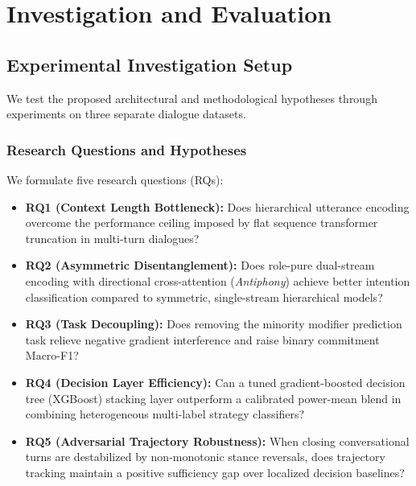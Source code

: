\chapter{Investigation and Evaluation}
\label{ch:evaluation}

\section{Experimental Investigation Setup}
\label{sec:investigation}

We test the proposed architectural and methodological hypotheses through experiments on three separate dialogue datasets.

\subsection{Research Questions and Hypotheses}
We formulate five research questions (RQs):
\begin{itemize}
  \item \textbf{RQ1 (Context Length Bottleneck):} Does hierarchical utterance encoding overcome the performance ceiling imposed by flat sequence transformer truncation in multi-turn dialogues?
  \item \textbf{RQ2 (Asymmetric Disentanglement):} Does role-pure dual-stream encoding with directional cross-attention (\textit{Antiphony}) achieve better intention classification compared to symmetric, single-stream hierarchical models?
  \item \textbf{RQ3 (Task Decoupling):} Does removing the minority modifier prediction task relieve negative gradient interference and raise binary commitment Macro-F1?
  \item \textbf{RQ4 (Decision Layer Efficiency):} Can a tuned gradient-boosted decision tree (XGBoost) stacking layer outperform a calibrated power-mean blend in combining heterogeneous multi-label strategy classifiers?
  \item \textbf{RQ5 (Adversarial Trajectory Robustness):} When closing conversational turns are destabilized by non-monotonic stance reversals, does trajectory tracking maintain a positive sufficiency gap over localized decision baselines?
\end{itemize}

